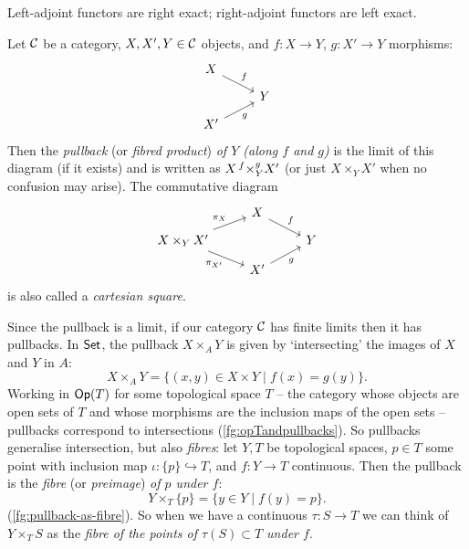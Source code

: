         \begin{corollary}\label{co:adjoint-exactness}
            Left-adjoint functors are right exact; right-adjoint functors are left exact.
        \end{corollary}

        \begin{definition}[Pullbacks]\label{df:pullbacks}
            Let $\mathcal{C}$ be a category, $X,X',Y\in\mathcal{C}$ objects, and $f\colon X\to Y$, $g\colon X'\to Y$ morphisms:
            \begin{equation*}
                \begin{tikzcd}[row sep=.7em]
                    X \arrow[dr, "f"] &\\
                     & Y\\
                    X' \arrow[ur, swap, "g"] &
                \end{tikzcd}
            \end{equation*}
            Then the \emph{pullback} (or \emph{fibred product}) \emph{of $Y$ (along $f$ and $g$)} is the limit of this diagram (if it exists) and is written as $X\prescript{f}{}{\times}^g_Y X'$ (or just $X\times_Y X'$ when no confusion may arise).
            The commutative diagram
            \begin{equation*}
                \begin{tikzcd}[row sep=.7em]
                     & X \arrow[dr, "f"] &\\
                    X\times_Y X' \arrow[ur, "\pi_X"] \arrow[dr, swap, "\pi_{X'}"] & & Y\\
                     & X' \arrow[ur, swap, "g"] &
                \end{tikzcd}
            \end{equation*}
            is also called a \emph{cartesian square}.
        \end{definition}

        Since the pullback is a limit, if our category $\mathcal{C}$ has finite limits then it has pullbacks.
        In $\mathsf{Set}$, the pullback $X\times_A Y$ is given by `intersecting' the images of $X$ and $Y$ in $A$:
        \begin{equation*}
            X\times_A Y = \{(x,y)\in X\times Y\mid f(x)=g(y)\}.
        \end{equation*}
        Working in $\mathsf{Op}(T)$ for some topological space $T$ -- the category whose objects are open sets of $T$ and whose morphisms are the inclusion maps of the open sets -- pullbacks correspond to intersections (\cref{fg:opTandpullbacks}).
        So pullbacks generalise intersection, but also \emph{fibres}: let $Y,T$ be topological spaces, $p\in T$ some point with inclusion map $\iota\colon \{p\}\hookrightarrow T$, and $f\colon Y\to T$ continuous.
        Then the pullback is the \emph{fibre} (or \emph{preimage}) \emph{of $p$ under $f$}:
        \begin{equation*}
            Y\times_T \{p\}=\{y\in Y\mid f(y)=p\}.
        \end{equation*}
        (\cref{fg:pullback-as-fibre}).
        So when we have a continuous $\tau\colon S\to T$ we can think of $Y\times_T S$ as the \emph{fibre of the points of $\tau(S)\subset T$ under $f$}.

